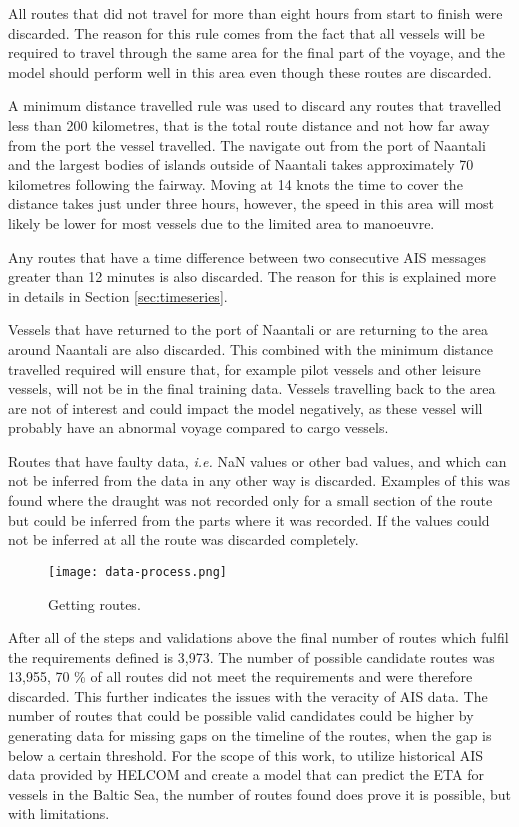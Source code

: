 \documentclass[../main.tex]{subfiles}
\begin{document}
All routes that did not travel for more than eight hours from start to finish were discarded. The reason for this rule comes from the fact that all vessels will be required to travel through the same area for the final part of the voyage, and the model should perform well in this area even though these routes are discarded.

A minimum distance travelled rule was used to discard any routes that travelled less than 200 kilometres, that is the total route distance and not how far away from the port the vessel travelled. The navigate out from the port of Naantali and the largest bodies of islands outside of Naantali takes approximately 70 kilometres following the fairway. Moving at 14 knots the time to cover the distance takes just under three hours, however, the speed in this area will most likely be lower for most vessels due to the limited area to manoeuvre.

Any routes that have a time difference between two consecutive AIS messages greater than 12 minutes is also discarded. The reason for this is explained more in details in Section \ref{sec:timeseries}.

Vessels that have returned to the port of Naantali or are returning to the area around Naantali are also discarded. This combined with the minimum distance travelled required will ensure that, for example pilot vessels and other leisure vessels, will not be in the final training data. Vessels travelling back to the area are not of interest and could impact the model negatively, as these vessel will probably have an abnormal voyage compared to cargo vessels.

Routes that have faulty data, \textit{i.e.} NaN values or other bad values, and which can not be inferred from the data in any other way is discarded. Examples of this was found where the draught was not recorded only for a small section of the route but could be inferred from the parts where it was recorded. If the values could not be inferred at all the route was discarded completely.

\begin{figure}[H]
	\centering
	\texttt{[image: data-process.png]}
	\caption{Getting routes.}
	\label{fig:flowchart}
\end{figure}

After all of the steps and validations above the final number of routes which fulfil the requirements defined is 3,973. The number of possible candidate routes was 13,955, 70 \% of all routes did not meet the requirements and were therefore discarded. This further indicates the issues with the veracity of AIS data. The number of routes that could be possible valid candidates could be higher by generating data for missing gaps on the timeline of the routes, when the gap is below a certain threshold. For the scope of this work, to utilize historical AIS data provided by HELCOM and create a model that can predict the ETA for vessels in the Baltic Sea, the number of routes found does prove it is possible, but with limitations.
\end{document}
